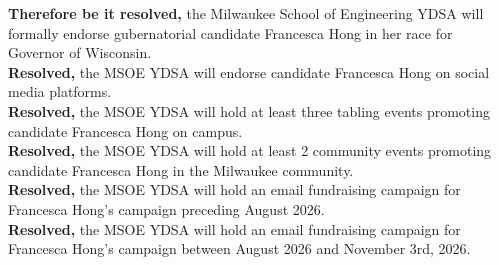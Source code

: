 \documentclass[12pt]{article}
\begin{document}
\newpage

\textbf{Therefore be it resolved,} the Milwaukee School of Engineering YDSA will
formally endorse gubernatorial candidate Francesca Hong in her race for Governor of Wisconsin. \\

\textbf{Resolved,} the MSOE YDSA will endorse candidate Francesca Hong on social media platforms. \\

\textbf{Resolved,} the MSOE YDSA will hold at least three tabling events promoting
candidate Francesca Hong on campus. \\

\textbf{Resolved,} the MSOE YDSA will hold at least 2 community events promoting
candidate Francesca Hong in the Milwaukee community. \\

\textbf{Resolved,} the MSOE YDSA will hold an email fundraising campaign for Francesca Hong's
campaign preceding August 2026. \\

\textbf{Resolved,} the MSOE YDSA will hold an email fundraising campaign for Francesca Hong's
campaign between August 2026 and November 3rd, 2026.
\end{document}
